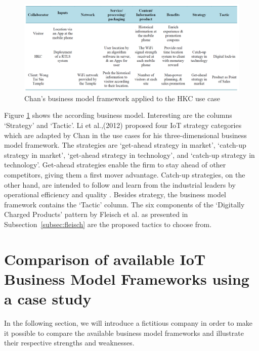 		\begin{figure}[ht]
		    \begin{center}
		    \includegraphics[scale=0.4]{Talk11/chanexample.png}
		    \end{center}
		    \caption{Chan's business model framework applied to the HKC use case \cite[p.~560]{chan}}
		    \label{fig:chan_ex}
		\end{figure}

		Figure \ref{fig:chan_ex} shows the according business model. Interesting are the columns `Strategy' and `Tactic'. Li et al.,(2012) \cite{li} proposed four IoT strategy categories which are adapted by Chan in the use cases for his three-dimensional business model framework. The strategies are `get-ahead strategy in market', `catch-up strategy in market', `get-ahead strategy in technology', and `catch-up strategy in technology'. Get-ahead strategies enable the firm to stay ahead of other competitors, giving them a first mover advantage. Catch-up strategies, on the other hand, are intended to follow and learn from the industrial leaders by operational efficiency and quality \cite{chan}.
		Besides strategy, the business model framework contains the `Tactic' column. The six components of the `Digitally Charged Products' pattern by Fleisch et al. \cite{fleisch} as presented in Subsection~\ref{subsec:fleisch} are the proposed tactics to choose from.

\section{Comparison of available IoT Business Model Frameworks using a case study}
\label{sec:bmf_comparison}
	In the following section, we will introduce a fictitious company in order to make it possible to compare the available business model frameworks and illustrate their respective strengths and weaknesses.

